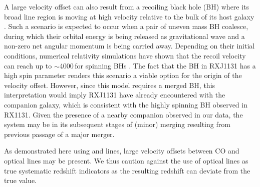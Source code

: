 \documentclass[]{emulateapj}
\begin{document}
A large velocity offset can also result from a recoiling black hole (BH) where its broad line region
is moving at high velocity relative to the bulk of its host galaxy 
\citep{Madau04a, Bonning07a, Loeb07a}. 
Such a scenario is expected to occur 
when a pair of uneven mass BH coalesce, during which their orbital energy is being released 
as gravitational wave and a 
non-zero net angular momentum is being carried away.
Depending on their initial conditions, numerical relativity simulations have shown that
the recoil velocity can reach up to $\sim$4000\,\kms for spinning BHs \citep[\eg][]{Campanelli07a}.
The fact that the BH in RXJ1131 has a high spin parameter \citep{Reis14a}
renders this scenario a viable option for the origin
of the velocity offset. 
However, since this model requires a merged BH, this interpretation would imply RXJ1131 have 
already encountered with the companion galaxy, which is consistent with
the highly spinning BH observed in RX1131.
Given the presence of a nearby companion observed in our data, the system may be in its 
subsequent stages of (minor) merging resulting from previous passage of a major merger.

As demonstrated here using \mgii and \oiii lines, large velocity offsets between CO and optical lines may be present.
We thus caution against the use of optical lines as 
true systematic redshift indicators as the resulting redshift can deviate from the 
true value.
\end{document}
